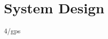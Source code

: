 
\chapter{System Design} %



\ifpdf
    \graphicspath{{X/figures/PNG/}{X/figures/PDF/}{X/figures/}}
\else
    \graphicspath{{X/figures/EPS/}{X/figures/}}
\fi



 {4/gps}





